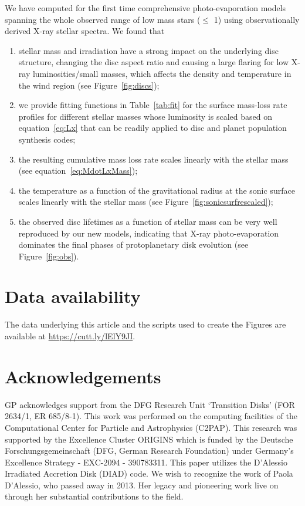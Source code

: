 \documentclass[usenatbib,useAMS,usedcolumn]{mnras}
\begin{document}
  We have computed for the first time comprehensive photo-evaporation models spanning the whole observed range of low mass stars ($\leq$ \SI{1}{\solarmass}) using observationally derived X-ray stellar spectra. 
  We found that

   \begin{enumerate}
      \item stellar mass and irradiation have a strong impact on the underlying disc structure, changing the disc aspect ratio and causing a large flaring for low X-ray luminosities/small masses, which affects the density and temperature in the wind region (see Figure~\ref{fig:discs});
      \item we provide fitting functions in Table~\ref{tab:fit} for the surface mass-loss rate profiles for different stellar masses whose luminosity is scaled based on equation~\ref{eq:Lx} that can be readily applied to disc and planet population synthesis codes;
      \item the resulting cumulative mass loss rate scales linearly with the stellar mass (see equation~\ref{eq:MdotLxMass});
      \item the temperature as a function of the gravitational radius at the sonic surface scales linearly with the stellar mass (see Figure~\ref{fig:sonicsurfrescaled});
      \item the observed disc lifetimes as a function of stellar mass can be very well reproduced by our new models, indicating that X-ray photo-evaporation dominates the final phases of protoplanetary disk evolution (see Figure~\ref{fig:obs}).
   \end{enumerate}

\section{Data availability}
   The data underlying this article and the scripts used to create the Figures are available at \href{https://cutt.ly/lElY9JI}{https://cutt.ly/lElY9JI}.

\section*{Acknowledgements}

    GP acknowledges support from the DFG Research Unit ‘Transition Disks’ (FOR 2634/1, ER 685/8-1).
    This work was performed on the computing facilities of the Computational Center for Particle and Astrophysics (C2PAP).
    This research was supported by the Excellence Cluster ORIGINS which is funded by the Deutsche Forschungsgemeinschaft (DFG, German Research Foundation) under Germany's Excellence Strategy - EXC-2094 - 390783311.
    This paper utilizes the D’Alessio Irradiated Accretion Disk (DIAD) code. We wish to recognize the work of Paola D’Alessio, who passed away in 2013. Her legacy and pioneering work live on through her substantial contributions to the field.




\bsp	%
\label{lastpage}
\end{document}
